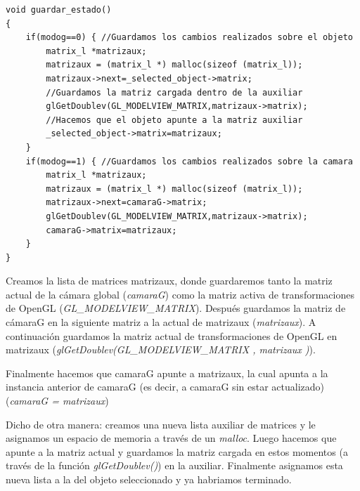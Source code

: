 \documentclass[12pt,a4paper]{article}
\begin{document}
\begin{enumerate}
\begin{lstlisting}
void guardar_estado()
{
    if(modog==0) { //Guardamos los cambios realizados sobre el objeto
        matrix_l *matrizaux;
        matrizaux = (matrix_l *) malloc(sizeof (matrix_l));
        matrizaux->next=_selected_object->matrix;
        //Guardamos la matriz cargada dentro de la auxiliar
        glGetDoublev(GL_MODELVIEW_MATRIX,matrizaux->matrix);
        //Hacemos que el objeto apunte a la matriz auxiliar
        _selected_object->matrix=matrizaux;   
    }
    if(modog==1) { //Guardamos los cambios realizados sobre la camara
        matrix_l *matrizaux;
        matrizaux = (matrix_l *) malloc(sizeof (matrix_l));
        matrizaux->next=camaraG->matrix;
        glGetDoublev(GL_MODELVIEW_MATRIX,matrizaux->matrix);
        camaraG->matrix=matrizaux; 
    }
}
\end{lstlisting}
Creamos la lista de matrices matrizaux, donde guardaremos tanto la matriz actual de la cámara global (\textit{camaraG}) como la matriz activa de transformaciones de OpenGL (\textit{GL\_MODELVIEW\_MATRIX}).
Después guardamos la matriz de cámaraG en la siguiente matriz a la actual de matrizaux
(\textit{matrizaux\rightarrownext}). A continuación guardamos la matriz actual de transformaciones de OpenGL en matrizaux (\textit{glGetDoublev(GL\_MODELVIEW\_MATRIX , matrizaux \rightarrowmatrix)}).\newline

Finalmente hacemos que camaraG apunte a matrizaux, la cual apunta a la instancia anterior de camaraG (es decir, a camaraG sin estar actualizado) (\textit{camaraG \rightarrowmatrix = matrizaux})

Dicho de otra manera: creamos una nueva lista auxiliar de matrices y le asignamos un espacio de memoria a través de un \textit{malloc}. Luego hacemos que apunte a la matriz actual y guardamos la matriz cargada en estos momentos (a través de la función \textit{glGetDoublev()}) en la auxiliar. Finalmente asignamos esta nueva lista a la del objeto seleccionado y ya habriamos terminado.\newline

\newline
\newline




\end{enumerate}
\end{document}
